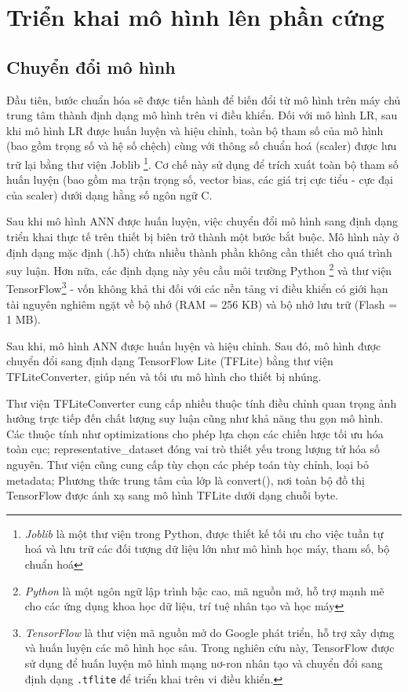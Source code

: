 \section{Triển khai mô hình lên phần cứng}
\subsection{Chuyển đổi mô hình}

Đầu tiên, bước chuẩn hóa sẽ được tiến hành để biến đổi từ mô hình trên máy chủ trung tâm thành định dạng mô hình trên vi điều khiển.
Đối với mô hình LR, sau khi mô hình LR được huấn luyện và hiệu chỉnh,
toàn bộ tham số của mô hình (bao gồm trọng số và hệ số chệch)
cùng với thông số chuẩn hoá (scaler) được lưu trữ lại bằng thư viện Joblib
\footnote{\textit{Joblib} là một thư viện trong Python, được thiết kế tối ưu cho việc tuần tự hoá  và lưu trữ các đối tượng dữ liệu lớn như mô hình học máy, tham số, bộ chuẩn hoá}.
Cơ chế này sử dụng để trích xuất toàn bộ tham số huấn luyện
(bao gồm ma trận trọng số, vector bias, các giá trị cực tiểu -
cực đại của scaler) dưới dạng hằng số ngôn ngữ C.

Sau khi mô hình ANN được huấn luyện, việc chuyển đổi mô hình sang định dạng
triển khai thực tế trên thiết bị biên trở thành một bước bắt buộc. Mô hình này
ở định dạng mặc định (.h5) chứa nhiều thành phần không cần thiết cho quá trình
suy luận. Hơn nữa, các định dạng này yêu cầu môi trường Python
\footnote{\textit{Python} là một ngôn ngữ lập trình bậc cao, mã nguồn mở, hỗ
    trợ mạnh mẽ cho các ứng dụng khoa học dữ liệu, trí tuệ nhân tạo và học máy} và
thư viện TensorFlow\footnote{\textit{TensorFlow} là thư viện mã nguồn mở do
    Google phát triển, hỗ trợ xây dựng và huấn luyện các mô hình học sâu. Trong
    nghiên cứu này, TensorFlow được sử dụng để huấn luyện mô hình mạng nơ-ron nhân
    tạo và chuyển đổi sang định dạng \texttt{.tflite} để triển khai trên vi điều
    khiển.} - vốn không khả thi đối với các nền tảng vi điều khiển có giới hạn tài
nguyên nghiêm ngặt về bộ nhớ (RAM = 256 KB) và bộ nhớ lưu trữ (Flash = 1 MB).

Sau khi, mô hình ANN được huấn luyện và hiệu chỉnh. Sau đó, mô hình được chuyển
đổi sang định dạng TensorFlow Lite (TFLite) bằng thư viện TFLiteConverter, giúp
nén và tối ưu mô hình cho thiết bị nhúng.

Thư viện TFLiteConverter cung cấp nhiều thuộc tính điều chỉnh quan trọng ảnh
hưởng trực tiếp đến chất lượng suy luận cũng như khả năng thu gọn mô hình. Các
thuộc tính như optimizations cho phép lựa chọn các chiến lược tối ưu hóa toàn
cục; representative\_dataset đóng vai trò thiết yếu trong lượng tử hóa số
nguyên. Thư viện cũng cung cấp tùy chọn các phép toán tùy chỉnh, loại bỏ
metadata; Phương thức trung tâm của lớp là convert(), nơi toàn bộ đồ thị
TensorFlow được ánh xạ sang mô hình TFLite dưới dạng chuỗi byte.


